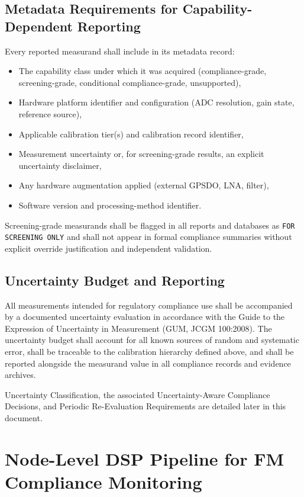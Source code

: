 \documentclass[11pt]{article}
\begin{document}
\subsection*{Metadata Requirements for Capability-Dependent Reporting}

Every reported measurand shall include in its metadata record:

\begin{itemize}
    \item The capability class under which it was acquired (compliance-grade, screening-grade, conditional compliance-grade, unsupported),
    \item Hardware platform identifier and configuration (ADC resolution, gain state, reference source),
    \item Applicable calibration tier(s) and calibration record identifier,
    \item Measurement uncertainty or, for screening-grade results, an explicit uncertainty disclaimer,
    \item Any hardware augmentation applied (external GPSDO, LNA, filter),
    \item Software version and processing-method identifier.
\end{itemize}

Screening-grade measurands shall be flagged in all reports and databases as \texttt{FOR SCREENING ONLY} and shall not appear in formal compliance summaries without explicit override justification and independent validation.

\subsection*{Uncertainty Budget and Reporting}

All measurements intended for regulatory compliance use shall be accompanied by a documented uncertainty evaluation in accordance with the Guide to the Expression of Uncertainty in Measurement (GUM, JCGM 100:2008). The uncertainty budget shall account for all known sources of random and systematic error, shall be traceable to the calibration hierarchy defined above, and shall be reported alongside the measurand value in all compliance records and evidence archives.

Uncertainty Classification, the associated Uncertainty-Aware Compliance Decisions, and Periodic Re-Evaluation Requirements are detailed later in this document.

\section{Node-Level DSP Pipeline for FM Compliance Monitoring}
\end{document}
